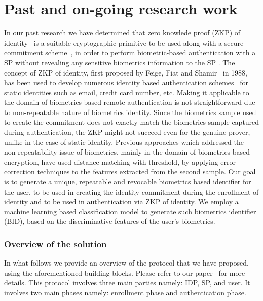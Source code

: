 \documentclass[10pt]{article}
\begin{document}
\section{Past and on-going research work}
In our past research we have determined that zero knowlede proof (ZKP) of identity~\cite{fiat-shamir} is a suitable cryptographic primitive to be used along with a secure commitment 
scheme~\cite{pedersenCommitment}, in order to perform biometric-based authentication with a SP without revealing any sensitive biometrics information to the SP . The concept of ZKP of 
identity, first proposed by Feige, Fiat and Shamir~\cite{fiat-shamir} in 1988, has been used to develop numerous identity based authentication 
schemes~\cite{idemixConcepts, DAA} for static identities such as email, credit card number, etc. Making it applicable to the domain of biometrics 
based remote authentication is not straightforward due to non-repeatable nature of biometrics identity. 
Since the biometrics sample used to create the commitment does not exactly match the biometrics sample captured during 
authentication, the ZKP might not succeed even for the genuine prover, unlike in the case of static identity.
Previous approaches which addressed the non-repeatability issue of biometrics, mainly in the domain of biometrics based encryption, have used 
distance matching with threshold, by applying error correction techniques to the features extracted from the second sample. 
Our goal is to generate a unique, repeatable and revocable biometrics based identifier for the user, to be used in creating the identity 
commitment during the enrollment of identity and to be used in authentication via ZKP of identity. We employ a machine 
learning based classification model to generate such biometrics identifier (BID), based on the discriminative features of the user's biometrics.

\subsubsection*{Overview of the solution}

In what follows we provide an overview of the protocol that we have proposed, using the aforementioned building blocks. Please refer to our 
paper~\cite{ours} for more details. This protocol involves three main parties namely: IDP, SP, and user. It involves two main phases namely: 
enrollment phase and authentication phase.\\
\end{document}
